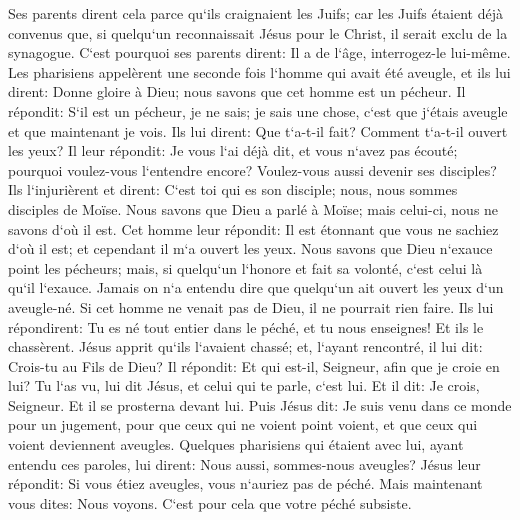 \verse Ses parents dirent cela parce qu`ils craignaient les Juifs; car les Juifs étaient déjà convenus que, si quelqu`un reconnaissait Jésus pour le Christ, il serait exclu de la synagogue. 
\verse C`est pourquoi ses parents dirent: Il a de l`âge, interrogez-le lui-même. 
\verse Les pharisiens appelèrent une seconde fois l`homme qui avait été aveugle, et ils lui dirent: Donne gloire à Dieu; nous savons que cet homme est un pécheur. 
\verse Il répondit: S`il est un pécheur, je ne sais; je sais une chose, c`est que j`étais aveugle et que maintenant je vois. 
\verse Ils lui dirent: Que t`a-t-il fait? Comment t`a-t-il ouvert les yeux? 
\verse Il leur répondit: Je vous l`ai déjà dit, et vous n`avez pas écouté; pourquoi voulez-vous l`entendre encore? Voulez-vous aussi devenir ses disciples? 
\verse Ils l`injurièrent et dirent: C`est toi qui es son disciple; nous, nous sommes disciples de Moïse. 
\verse Nous savons que Dieu a parlé à Moïse; mais celui-ci, nous ne savons d`où il est. 
\verse Cet homme leur répondit: Il est étonnant que vous ne sachiez d`où il est; et cependant il m`a ouvert les yeux. 
\verse Nous savons que Dieu n`exauce point les pécheurs; mais, si quelqu`un l`honore et fait sa volonté, c`est celui là qu`il l`exauce. 
\verse Jamais on n`a entendu dire que quelqu`un ait ouvert les yeux d`un aveugle-né. 
\verse Si cet homme ne venait pas de Dieu, il ne pourrait rien faire. 
\verse Ils lui répondirent: Tu es né tout entier dans le péché, et tu nous enseignes! Et ils le chassèrent. 
\verse Jésus apprit qu`ils l`avaient chassé; et, l`ayant rencontré, il lui dit: Crois-tu au Fils de Dieu? 
\verse Il répondit: Et qui est-il, Seigneur, afin que je croie en lui? 
\verse Tu l`as vu, lui dit Jésus, et celui qui te parle, c`est lui. 
\verse Et il dit: Je crois, Seigneur. Et il se prosterna devant lui. 
\verse Puis Jésus dit: Je suis venu dans ce monde pour un jugement, pour que ceux qui ne voient point voient, et que ceux qui voient deviennent aveugles. 
\verse Quelques pharisiens qui étaient avec lui, ayant entendu ces paroles, lui dirent: Nous aussi, sommes-nous aveugles? 
\verse Jésus leur répondit: Si vous étiez aveugles, vous n`auriez pas de péché. Mais maintenant vous dites: Nous voyons. C`est pour cela que votre péché subsiste. 

\chapter{}

